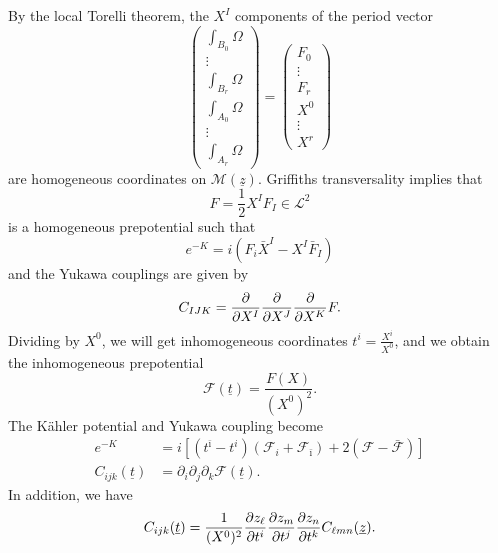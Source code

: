 \documentclass[10pt]{amsart}
\theoremstyle{definition}
\theoremstyle{remark}
\theoremstyle{plain}
\theoremstyle{definition}
\theoremstyle{remark}
\newcommand{\mc}[1]{\mathcal{#1}}
\newcommand{\ut}{\ul{t}}
\newcommand{\uz}{\ul{z}}
\newcommand{\ul}[1]{\underline{#1}}
\newcommand{\1}{\mathbf{1}}
\newcommand{\2}{\mathbf{2}}
\newcommand{\3}{\mathbf{3}}
\begin{document}
By the local Torelli theorem, the $X^I$ components of the period vector
\[ \begin{pmatrix}
    \int_{B_0} \Omega \\
    \vdots \\
    \int_{B_r} \Omega \\
    \int_{A_0} \Omega \\
    \vdots \\
    \int_{A_r} \Omega
\end{pmatrix} = \begin{pmatrix}
    F_0 \\
    \vdots \\
    F_r \\
    X^0 \\
    \vdots \\
    X^r
\end{pmatrix}
\]
are homogeneous coordinates on $\mc{M}(\uz)$. Griffiths transversality implies that 
\[ F = \frac{1}{2}X^I F_I \in \mc{L}^2 \]
is a homogeneous prepotential such that 
\[ e^{-K} = i (F_i \bar{X}^I - X^I \bar{F}_I) \]
and the Yukawa couplings are given by
\[ C_{IJK} = \pdv{}{X^I}\pdv{}{X^J} \pdv{}{X^K} F. \]
Dividing by $X^0$, we will get inhomogeneous coordinates $t^i = \frac{X^i}{X^0}$, and we obtain the inhomogeneous prepotential
\[ \mc{F}(\ut) = \frac{F(X)}{(X^0)^2}. \]
The K\"ahler potential and Yukawa coupling become
\begin{align*}
    e^{-K} &= i [(t^{\bar{\imath}} - t^i)(\mc{F}_i + \mc{F}_{\bar{\imath}}) + 2 (\mc{F} - \bar{\mc{F}})] \\
    C_{ijk}(\ut) &= \partial_i \partial_j \partial_k \mc{F}(\ut).
\end{align*}
In addition, we have
\[ C_{ijk}(\ut) = \frac{1}{(X^0)^2} \pdv{z_{\ell}}{t^i} \pdv{z_m}{t^j}\pdv{z_n}{t^k} C_{\ell m n} (\uz). \]
\end{document}
